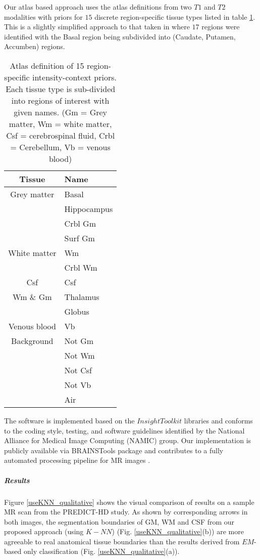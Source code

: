 Our atlas based approach uses the atlas definitions from two $T1$ and $T2$ modalities with priors for $15$ discrete region-specific tissue types listed in table \ref{tab:tissue_names}. This is a slightly simplified approach to that taken in \cite{Kim2013} where $17$ regions were identified with the Basal region being subdivided into (Caudate, Putamen, Accumben) regions.
\begin{table}
\centering
\caption{Atlas definition of 15 region-specific intensity-context priors. Each tissue type is sub-divided into regions of interest with given names. (Gm = Grey matter, Wm = white matter, Csf = cerebrospinal fluid, Crbl = Cerebellum, Vb = venous blood) }
\begin{tabular}{c|l}
\hline \hline
Tissue & Name \\
\hline
Grey matter & Basal \\
 & Hippocampus \\
 & Crbl Gm \\
 & Surf Gm \\ [0.6ex]
White matter & Wm \\
 & Crbl Wm \\ [0.6ex]
Csf & Csf \\ [0.6ex]
Wm \& Gm & Thalamus \\
 & Globus \\ [0.6ex]
Venous blood & Vb \\ [0.6ex]
Background & Not Gm \\
  & Not Wm \\
  & Not Csf \\
  & Not Vb \\
  & Air \\
\hline \hline
\end{tabular}
\label{tab:tissue_names}
\end{table}

The software is implemented based on the $InsightToolkit$ libraries \cite{johnson2015itk1, johnson2015itk2} and conforms to the coding style, testing, and software guidelines identified by the National Alliance for Medical Image Computing (NAMIC) group. Our implementation is publicly available via BRAINSTools package \cite{BRAINSTools} and contributes to a fully automated processing pipeline for MR images \cite{Kim2014,Pierson2011}.

\subparagraph{Results} %

Figure \ref{useKNN_qualitative} shows the visual comparison of results on a sample MR scan from the PREDICT-HD study. As shown by corresponding arrows in both images, the segmentation boundaries of GM, WM and CSF from our proposed approach (using $K-NN$) (Fig. \ref{useKNN_qualitative}(b)) are more agreeable to real anatomical tissue boundaries than the results derived from $EM$-based only classification (Fig. \ref{useKNN_qualitative}(a)).

